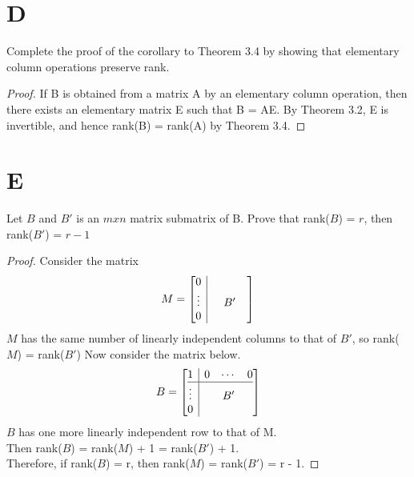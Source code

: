 \documentclass[11pt]{scrartcl}
\begin{document}
\section{D}
Complete the proof of the corollary to Theorem 3.4 by showing that elementary column operations preserve rank.
\begin{proof}
	If B is obtained from a matrix A by an elementary column operation,
	then there exists an elementary matrix E such that B = AE. By Theorem 3.2, 
	E is invertible, and hence rank(B) = rank(A) by Theorem 3.4. 
\end{proof}
	

\section{E}
Let $B$ and $B'$ is an $mxn$ matrix submatrix of B. Prove that rank($B$) = $r$, then rank($B'$) = $r - 1$
\begin{proof}
Consider the matrix 
\[
M=
\left[\begin{array}{@{}c|ccc@{}}
0 & & & \\
\vdots & & B' & \\
0 & & &
\end{array}\right]	
\]
$M$ has the same number of linearly independent columns to that of $B'$, so rank($M$) = rank($B'$)
Now consider the matrix below.
\[
B=
\left[\begin{array}{@{}c|ccc@{}}
1 & 0 &\cdots &0 \\ \hline
\vdots & & B' & \\
0 & & &
\end{array}\right]	
\]
$B$ has one more linearly independent row to that of M.\\ Then rank($B$) = rank($M$) + 1 = rank($B'$) + 1.\\
Therefore, if rank($B$) = r, then rank($M$) = rank($B'$) = r - 1.
\end{proof}
	
\end{document}
